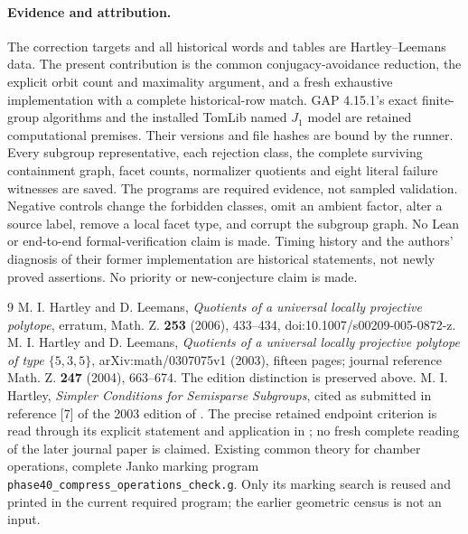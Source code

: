 \documentclass[11pt,a4paper]{article}
\begin{document}
\paragraph{Evidence and attribution.}
The correction targets and all historical words and tables are Hartley--Leemans data. The present contribution is the common conjugacy-avoidance reduction, the explicit orbit count and maximality argument, and a fresh exhaustive implementation with a complete historical-row match. GAP 4.15.1's exact finite-group algorithms and the installed TomLib named $J_1$ model are retained computational premises. Their versions and file hashes are bound by the runner. Every subgroup representative, each rejection class, the complete surviving containment graph, facet counts, normalizer quotients and eight literal failure witnesses are saved. The programs are required evidence, not sampled validation. Negative controls change the forbidden classes, omit an ambient factor, alter a source label, remove a local facet type, and corrupt the subgroup graph. No Lean or end-to-end formal-verification claim is made. Timing history and the authors' diagnosis of their former implementation are historical statements, not newly proved assertions. No priority or new-conjecture claim is made.

\begin{thebibliography}{9}
 M. I. Hartley and D. Leemans, \emph{Quotients of a universal locally projective polytope}, erratum, Math. Z. \textbf{253} (2006), 433--434, doi:10.1007/s00209-005-0872-z.
 M. I. Hartley and D. Leemans, \emph{Quotients of a universal locally projective polytope of type $\{5,3,5\}$}, arXiv:math/0307075v1 (2003), fifteen pages; journal reference Math. Z. \textbf{247} (2004), 663--674. The edition distinction is preserved above.
 M. I. Hartley, \emph{Simpler Conditions for Semisparse Subgroups}, cited as submitted in reference [7] of the 2003 edition of \cite{original}. The precise retained endpoint criterion is read through its explicit statement and application in \cite{original}; no fresh complete reading of the later journal paper is claimed.
 Existing common theory for chamber operations, complete Janko marking program \texttt{phase40\_compress\_operations\_check.g}. Only its marking search is reused and printed in the current required program; the earlier geometric census is not an input.
\end{thebibliography}
\end{document}
